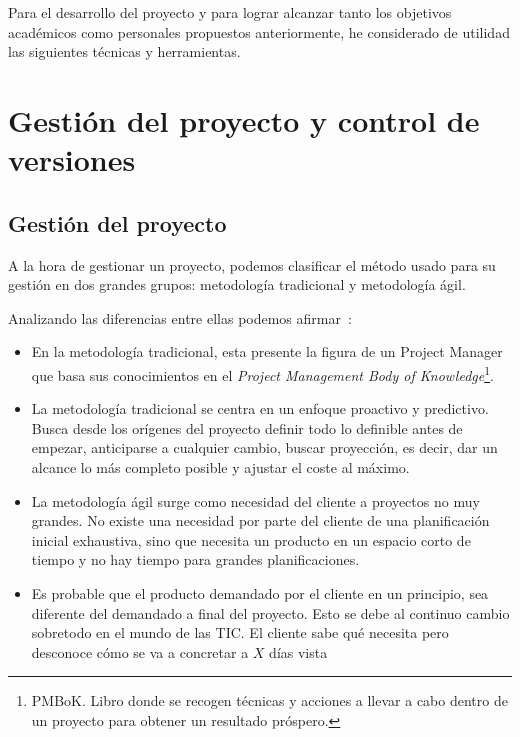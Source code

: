 
Para el desarrollo del proyecto y para lograr alcanzar tanto los objetivos académicos como personales propuestos anteriormente, he considerado de utilidad las siguientes técnicas y herramientas.

\section{Gestión del proyecto y control de versiones}

\subsection{Gestión del proyecto}

A la hora de gestionar un proyecto, podemos clasificar el método usado para su gestión en dos grandes grupos: metodología tradicional y metodología ágil.

Analizando las diferencias entre ellas podemos afirmar~\cite{web:diferencias-metodologias}:

\begin{itemize}
	\item En la metodología tradicional, esta presente la figura de un Project Manager que basa sus conocimientos en el \textit{Project Management Body of Knowledge}\footnote{PMBoK. Libro donde se recogen técnicas y acciones a llevar a cabo dentro de un proyecto para obtener un resultado próspero.}.
	\item La metodología tradicional se centra en un enfoque proactivo y predictivo. Busca desde los orígenes del proyecto definir todo lo definible antes de empezar, anticiparse a cualquier cambio, buscar proyección, es decir, dar un alcance lo más completo posible y ajustar el coste al máximo.
	
	\item La metodología ágil surge como necesidad del cliente a proyectos no muy grandes. No existe una necesidad por parte del cliente de una planificación inicial exhaustiva, sino que necesita un producto en un espacio corto de tiempo y no hay tiempo para grandes planificaciones.
	\item Es probable que el producto demandado por el cliente en un principio, sea diferente del demandado a final del proyecto. Esto se debe al continuo cambio sobretodo en el mundo de las TIC. El cliente sabe qué necesita pero desconoce cómo se va a concretar a $X$ días vista
\end{itemize}

